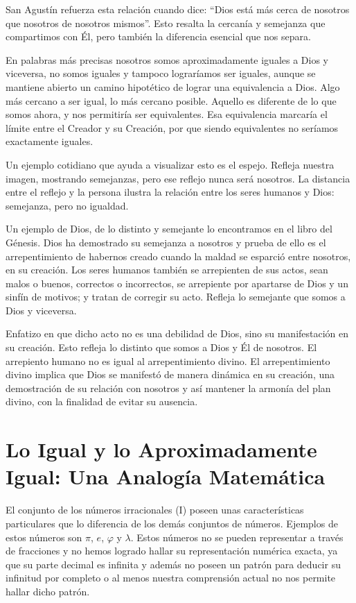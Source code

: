 \documentclass[letterpaper,13pt]{article}
\begin{document}
San Agustín refuerza esta relación cuando dice: ``Dios está más cerca de nosotros que nosotros de nosotros mismos''. Esto resalta la cercanía y semejanza que compartimos con Él, pero también la diferencia esencial que nos separa.

En palabras más precisas nosotros somos aproximadamente iguales a Dios y viceversa, no somos iguales y tampoco lograríamos ser iguales, aunque se mantiene abierto un camino hipotético de lograr una equivalencia a Dios. Algo más cercano a ser igual, lo más cercano posible. Aquello es diferente de lo que somos ahora, y nos permitiría ser equivalentes. Esa equivalencia marcaría el límite entre el Creador y su Creación, por que siendo equivalentes no seríamos exactamente iguales.

Un ejemplo cotidiano que ayuda a visualizar esto es el espejo. Refleja nuestra imagen, mostrando semejanzas, pero ese reflejo nunca será nosotros. La distancia entre el reflejo y la persona ilustra la relación entre los seres humanos y Dios: semejanza, pero no igualdad.

Un ejemplo de Dios, de lo distinto y semejante lo encontramos en el libro del Génesis. Dios ha demostrado su semejanza a nosotros y prueba de ello es el arrepentimiento de habernos creado cuando la maldad se esparció entre nosotros, en su creación. Los seres humanos también se arrepienten de sus actos, sean malos o buenos, correctos o incorrectos, se arrepiente por apartarse de Dios y un sinfín de motivos; y tratan de corregir su acto. Refleja lo semejante que somos a Dios y viceversa.

Enfatizo en que dicho acto no es una debilidad de Dios, sino su manifestación en su creación. Esto refleja lo distinto que somos a Dios y Él de nosotros. El arrepiento humano no es igual al arrepentimiento divino. El arrepentimiento divino implica que Dios se manifestó de manera dinámica en su creación, una demostración de su relación con nosotros y así mantener la armonía del plan divino, con la finalidad de evitar su ausencia.

\section{Lo Igual y lo Aproximadamente Igual: Una Analogía Matemática}

El conjunto de los números irracionales (I) poseen unas características particulares que lo diferencia de los demás conjuntos de números. Ejemplos de estos números son $\pi$, $e$, $\varphi$ y $\lambda$. Estos números no se pueden representar a través de fracciones y no hemos logrado hallar su representación numérica exacta, ya que su parte decimal es infinita y además no poseen un patrón para deducir su infinitud por completo o al menos nuestra comprensión actual no nos permite hallar dicho patrón.
\end{document}
